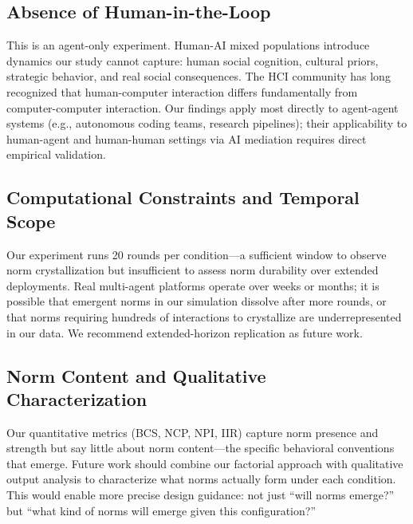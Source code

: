 \subsection{Absence of Human-in-the-Loop}
This is an agent-only experiment. Human-AI mixed populations introduce dynamics our study cannot capture: human social cognition, cultural priors, strategic behavior, and real social consequences. The HCI community has long recognized that human-computer interaction differs fundamentally from computer-computer interaction. Our findings apply most directly to agent-agent systems (e.g., autonomous coding teams, research pipelines); their applicability to human-agent and human-human settings via AI mediation requires direct empirical validation.

\subsection{Computational Constraints and Temporal Scope}
Our experiment runs 20 rounds per condition—a sufficient window to observe norm crystallization but insufficient to assess norm durability over extended deployments. Real multi-agent platforms operate over weeks or months; it is possible that emergent norms in our simulation dissolve after more rounds, or that norms requiring hundreds of interactions to crystallize are underrepresented in our data. We recommend extended-horizon replication as future work.

\subsection{Norm Content and Qualitative Characterization}
Our quantitative metrics (BCS, NCP, NPI, IIR) capture norm presence and strength but say little about norm content—the specific behavioral conventions that emerge. Future work should combine our factorial approach with qualitative output analysis to characterize what norms actually form under each condition. This would enable more precise design guidance: not just ``will norms emerge?'' but ``what kind of norms will emerge given this configuration?''

